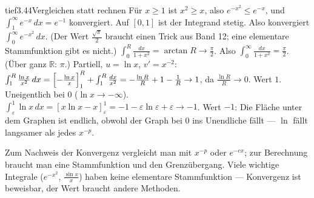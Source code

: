 \begin{loesungkarte}{tief}{3.44}{Vergleichen statt rechnen}
Für $x\ge1$ ist $x^{2}\ge x$, also $e^{-x^{2}}\le e^{-x}$, und $\int_1^{\infty}e^{-x}\,dx = e^{-1}$ konvergiert. Auf $[0, 1]$ ist der Integrand stetig. Also konvergiert $\int_0^{\infty}e^{-x^{2}}\,dx$. (Der Wert $\frac{\sqrt\pi}2$ braucht einen Trick aus Band 12; eine elementare Stammfunktion gibt es nicht.)
$\int_0^R\frac{dx}{1 + x^{2}} = \arctan R\to\frac\pi2$. Also $\int_0^{\infty}\frac{dx}{1 + x^{2}} = \frac\pi2$. (Über ganz $\mathbb R$: $\pi$.)
Partiell, $u = \ln x$, $v' = x^{-2}$: $\int_1^R\frac{\ln x}{x^{2}}\,dx = \Bigl[-\frac{\ln x}x\Bigr]_1^R + \int_1^R\frac{dx}{x^{2}} = -\frac{\ln R}R + 1 - \frac1R\to1$, da $\frac{\ln R}R\to0$. Wert $1$.
Uneigentlich bei $0$ ($\ln x\to-\infty$). $\int_\varepsilon^1\ln x\,dx = [x\ln x - x]_\varepsilon^1 = -1 - \varepsilon\ln\varepsilon + \varepsilon\to-1$. Wert $-1$: Die Fläche unter dem Graphen ist endlich, obwohl der Graph bei $0$ ins Unendliche fällt --- $\ln$ fällt langsamer als jedes $x^{-p}$.
\begin{mitnehmen}\kastentext
Zum Nachweis der Konvergenz vergleicht man mit $x^{-p}$ oder $e^{-cx}$; zur Berechnung braucht man eine Stammfunktion und den Grenzübergang. Viele wichtige Integrale ($e^{-x^{2}}$, $\frac{\sin x}x$) haben keine elementare Stammfunktion --- Konvergenz ist beweisbar, der Wert braucht andere Methoden.
\end{mitnehmen}
\end{loesungkarte}

